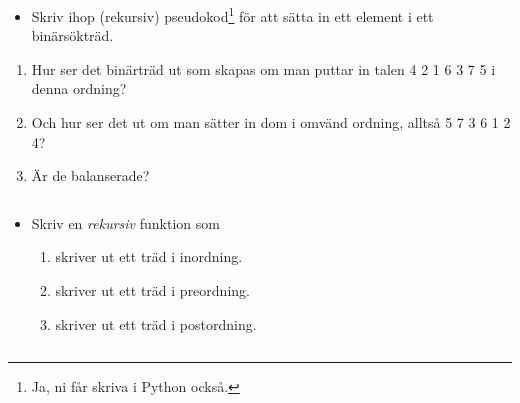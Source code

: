 \begin{frame}
  \begin{exercise}
    \begin{itemize}
      \item Skriv ihop (rekursiv) pseudokod\footnote{%
          Ja, ni får skriva i Python också.
        } för att sätta in ett element i ett binärsökträd.
    \end{itemize}
    \begin{enumerate}
      \item Hur ser det binärträd ut som skapas om man puttar in talen 4 2 1 6 
        3 7 5 i denna ordning?
      \item Och hur ser det ut om man sätter in dom i omvänd ordning, alltså 5 
        7 3 6 1 2 4?
      \item Är de balanserade?
    \end{enumerate}
  \end{exercise}
\end{frame}

\begin{frame}
  \begin{solution}
    \inputminted[firstline=22,lastline=34]{python}{src/bst.py}
  \end{solution}
\end{frame}

\begin{frame}
  \begin{exercise}
    \begin{itemize}
      \item Skriv en \emph{rekursiv} funktion som
        \begin{enumerate}
          \item skriver ut ett träd i inordning.
          \item skriver ut ett träd i preordning.
          \item skriver ut ett träd i postordning.
        \end{enumerate}
    \end{itemize}
  \end{exercise}
\end{frame}

\begin{frame}[fragile]
  \begin{solution}
    \inputminted[firstline=45,lastline=61]{python}{src/bst.py}
  \end{solution}
\end{frame}

